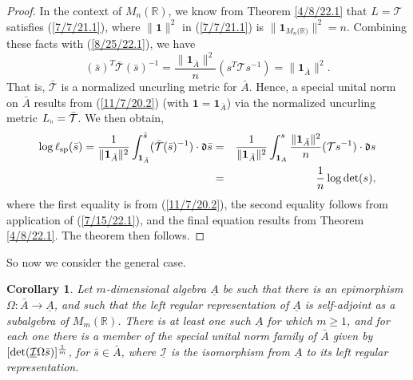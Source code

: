 \documentclass{amsart}
\numberwithin{equation}{section}
\newtheorem{corollary}[theorem]{Corollary}
\theoremstyle{definition}
\numberwithin{theorem}{section}
\begin{document}
\begin{proof}
In the context of $M_n(\mathbb{R})$, we know from Theorem \ref{4/8/22.1} that $L=\mathcal{T}$ satisfies (\ref{7/7/21.1}), where $\|\mathbf{1}\|^2$ in  (\ref{7/7/21.1}) is $\|\mathbf{1}_{M_n({\mathbb{R})}}\|^2 = n$.  Combining these facts with (\ref{8/25/22.1}), we have \begin{equation}\label{9/27/23.1} (\bar{s})^T \bar{\mathcal{T}} (\bar{s})^{-1} = \frac{\|\mathbf{1}_{\bar{A}}\|^2}{n}( s^T \mathcal{T} s^{-1}) = \|\mathbf{1}_{\bar{A}}\|^2 .\end{equation} 
That is, $\mathcal{\bar{T}}$ is a normalized uncurling metric for $\bar{A}$.  Hence, a special unital norm on $\bar{A}$ results from (\ref{11/7/20.2}) (with $\mathbf{1}=\mathbf{1}_{\bar{A}}$)  via the normalized uncurling metric $L_{\shortparallel} = \bar{\mathcal{T}}$.  
  We then obtain, 
\begin{eqnarray}\nonumber \log\ell_{\rm sp}(\bar{s}) = \frac{1}{\|\mathbf{1}_{\bar{A}}\|^2} \int_{\mathbf{1}_{\bar{A}}}^{\bar{s}} (\bar{\mathcal{T}}(\bar{s})^{-1})\cdot \mathfrak{d}\bar{s}
 &=& \frac{1}{\|\mathbf{1}_{\bar{A}}\|^2} \int_{\mathbf{1}_{A}}^{s} \frac{\|\mathbf{1}_{\bar{A}}\|^2}{n}(\mathcal{T}s^{-1})\cdot \mathfrak{d}s \\ &=& \frac{1}{n} \log\text{det}(s),\label{9/27/23.2}\end{eqnarray} where the first equality is from (\ref{11/7/20.2}), the second equality follows from application of (\ref{7/15/22.1}), and the final equation results from Theorem \ref{4/8/22.1}.
The theorem then follows. 
 \end{proof} 
 

So now we consider the general case.
 
  \begin{corollary}\label{11/17/22.1}
  Let $m$-dimensional algebra $\underline{A}$ be such that there is an epimorphism $\Omega:\bar{A}\rightarrow \underline{A}$, and such that the left regular representation of $\underline{A}$ is self-adjoint as a subalgebra of $M_m(\mathbb{R})$. There is at least one such $\underline{A}$ for which $m\ge 1$, and for each one there is a member of the special unital norm family of  $\bar{A}$ given by $[{\rm det}(\underline{\mathcal{I}}\Omega \bar{s})]^{\frac{1}{m}}$, for $\bar{s}\in\bar{A}$, where $\underline{\mathcal{I}}$ is the isomorphism from $\underline{A}$ to its left regular representation.
  \end{corollary}
 
\end{document}
